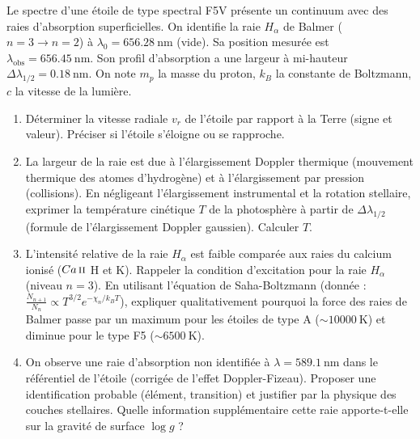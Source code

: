 \documentclass[11pt]{article}
\begin{document}
\begin{exercice}
Le spectre d'une étoile de type spectral F5V présente un continuum avec des raies d'absorption superficielles. On identifie la raie $H_\alpha$ de Balmer ($n=3 \to n=2$) à $\lambda_0 = \SI{656,28}{\nano\metre}$ (vide). Sa position mesurée est $\lambda_{\text{obs}} = \SI{656,45}{\nano\metre}$. Son profil d'absorption a une largeur à mi-hauteur $\Delta\lambda_{1/2} = \SI{0,18}{\nano\metre}$. On note $m_p$ la masse du proton, $k_B$ la constante de Boltzmann, $c$ la vitesse de la lumière.
\begin{enumerate}
    \item Déterminer la vitesse radiale $v_r$ de l'étoile par rapport à la Terre (signe et valeur). Préciser si l'étoile s'éloigne ou se rapproche.
    \item La largeur de la raie est due à l'élargissement Doppler thermique (mouvement thermique des atomes d'hydrogène) et à l'élargissement par pression (collisions). En négligeant l'élargissement instrumental et la rotation stellaire, exprimer la température cinétique $T$ de la photosphère à partir de $\Delta\lambda_{1/2}$ (formule de l'élargissement Doppler gaussien). Calculer $T$.
    \item L'intensité relative de la raie $H_\alpha$ est faible comparée aux raies du calcium ionisé ($Ca\,\textsc{ii}$ H et K). Rappeler la condition d'excitation pour la raie $H_\alpha$ (niveau $n=3$). En utilisant l'équation de Saha-Boltzmann (donnée : $\frac{N_{n+1}}{N_n} \propto T^{3/2} e^{-\chi_n/k_B T}$), expliquer qualitativement pourquoi la force des raies de Balmer passe par un maximum pour les étoiles de type A ($\sim \SI{10000}{\kelvin}$) et diminue pour le type F5 ($\sim \SI{6500}{\kelvin}$).
    \item On observe une raie d'absorption non identifiée à $\lambda = \SI{589,1}{\nano\metre}$ dans le référentiel de l'étoile (corrigée de l'effet Doppler-Fizeau). Proposer une identification probable (élément, transition) et justifier par la physique des couches stellaires. Quelle information supplémentaire cette raie apporte-t-elle sur la gravité de surface $\log g$ ?
\end{enumerate}
\end{exercice}
\end{document}
